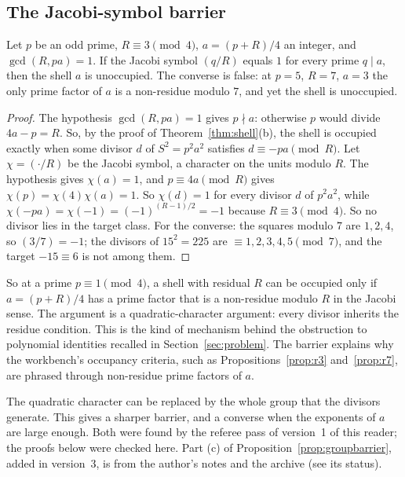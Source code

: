 \subsection{The Jacobi-symbol barrier}\label{ssec:jacobi}

\begin{proposition}\label{prop:jacobi}
Let $p$ be an odd prime, $R\equiv3\pmod4$, $a=(p+R)/4$ an integer, and $\gcd(R,pa)=1$. If the Jacobi symbol $(q/R)$ equals $1$ for every prime $q\mid a$, then the shell $a$ is unoccupied. The converse is false: at $p=5$, $R=7$, $a=3$ the only prime factor of $a$ is a non-residue modulo $7$, and yet the shell is unoccupied.
\end{proposition}
\begin{proof}
The hypothesis $\gcd(R,pa)=1$ gives $p\nmid a$: otherwise $p$ would divide $4a-p=R$. So, by the proof of Theorem~\ref{thm:shell}(b), the shell is occupied exactly when some divisor $d$ of $S^2=p^2a^2$ satisfies $d\equiv-pa\pmod R$. Let $\chi=(\cdot/R)$ be the Jacobi symbol, a character on the units modulo $R$. The hypothesis gives $\chi(a)=1$, and $p\equiv4a\pmod R$ gives $\chi(p)=\chi(4)\chi(a)=1$. So $\chi(d)=1$ for every divisor $d$ of $p^2a^2$, while $\chi(-pa)=\chi(-1)=(-1)^{(R-1)/2}=-1$ because $R\equiv3\pmod4$. So no divisor lies in the target class.
For the converse: the squares modulo $7$ are $1,2,4$, so $(3/7)=-1$; the divisors of $15^2=225$ are $\equiv1,2,3,4,5\pmod7$, and the target $-15\equiv6$ is not among them.
\end{proof}

So at a prime $p\equiv1\pmod4$, a shell with residual $R$ can be occupied only if $a=(p+R)/4$ has a prime factor that is a non-residue modulo $R$ in the Jacobi sense. The argument is a quadratic-character argument: every divisor inherits the residue condition. This is the kind of mechanism behind the obstruction to polynomial identities recalled in Section~\ref{sec:problem}. The barrier explains why the workbench's occupancy criteria, such as Propositions~\ref{prop:r3} and~\ref{prop:r7}, are phrased through non-residue prime factors of $a$.

The quadratic character can be replaced by the whole group that the divisors generate. This gives a sharper barrier, and a converse when the exponents of $a$ are large enough. Both were found by the referee pass of version~1 of this reader; the proofs below were checked here. Part (c) of Proposition~\ref{prop:groupbarrier}, added in version~3, is from the author's notes and the archive (see its status).

